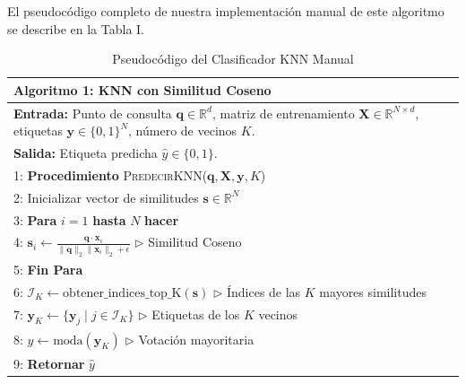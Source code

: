 \documentclass[twocolumn,10pt,journal]{IEEEtran}
\begin{document}
El pseudocódigo completo de nuestra implementación manual de este algoritmo se describe en la Tabla I.

\begin{table}[h]
\centering
\caption{Pseudocódigo del Clasificador KNN Manual}
\label{alg:knn}
\begin{tabular}{p{8cm}}
\toprule
\textbf{Algoritmo 1:} KNN con Similitud Coseno \\
\midrule
\textbf{Entrada:} Punto de consulta $\mathbf{q} \in \mathbb{R}^d$, matriz de entrenamiento $\mathbf{X} \in \mathbb{R}^{N \times d}$, etiquetas $\mathbf{y} \in \{0, 1\}^N$, número de vecinos $K$. \\
\textbf{Salida:} Etiqueta predicha $\hat{y} \in \{0, 1\}$. \\
\midrule
1: \textbf{Procedimiento} \textsc{PredecirKNN}($\mathbf{q}, \mathbf{X}, \mathbf{y}, K$) \\
2: \quad Inicializar vector de similitudes $\mathbf{s} \in \mathbb{R}^N$ \\
3: \quad \textbf{Para} $i = 1$ \textbf{hasta} $N$ \textbf{hacer} \\
4: \quad \quad $\mathbf{s}_i \leftarrow \frac{\mathbf{q} \cdot \mathbf{x}_i}{\|\mathbf{q}\|_2 \|\mathbf{x}_i\|_2 + \epsilon}$ \hfill $\triangleright$ Similitud Coseno \\
5: \quad \textbf{Fin Para} \\
6: \quad $\mathcal{I}_K \leftarrow \text{obtener\_indices\_top\_K}(\mathbf{s})$ \hfill $\triangleright$ Índices de las $K$ mayores similitudes \\
7: \quad $\mathbf{y}_K \leftarrow \{ \mathbf{y}_j \mid j \in \mathcal{I}_K \}$ \hfill $\triangleright$ Etiquetas de los $K$ vecinos \\
8: \quad $\hat{y} \leftarrow \text{moda}(\mathbf{y}_K)$ \hfill $\triangleright$ Votación mayoritaria \\
9: \quad \textbf{Retornar} $\hat{y}$ \\
\bottomrule
\end{tabular}
\end{table}
\end{document}
